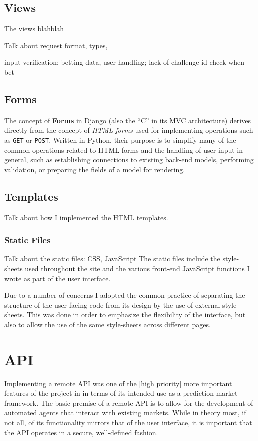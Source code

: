 \documentclass[bsc,frontabs,twoside,singlespacing,parskip,deptreport]{infthesis}     %
\begin{document}
	


\subsection{Views}
	The views blahblah

Talk about request format, types, 

input verification: betting data, user handling; lack of challenge-id-check-when-bet

\subsection{Forms}
	The concept of {\bf Forms} in Django (also the ``C'' in its MVC architecture) derives directly from the concept of {\em HTML forms} used for implementing operations such as {\tt GET} or {\tt POST}. Written in Python, their purpose is to simplify many of the common operations related to HTML forms and the handling of user input in general, such as establishing connections to existing back-end models, performing validation, or preparing the fields of a model for rendering. 


\subsection{Templates}
 Talk about how I implemented the HTML templates. 

\subsubsection{Static Files}
Talk about the static files: CSS, JavaScript
	The static files include the style-sheets used throughout the site and the various front-end JavaScript functions I wrote as part of the user interface. 

	Due to a number of concerns I adopted the common practice of separating the structure of the user-facing code from its design by the use of external style-sheets. This was done in order to emphasize the flexibility of the interface, but also to allow the use of the same style-sheets across different pages. 

	

\section{API}
    
    Implementing a remote API was one of the [high priority] more important features of the project in in terms of its intended use as a prediction market framework. The basic premise of a remote API is to allow for the development of automated agents that interact with existing markets. While in theory most, if not all, of its functionality mirrors that of the user interface, it is important that the API operates in a secure, well-defined fashion.
    
\end{document}
